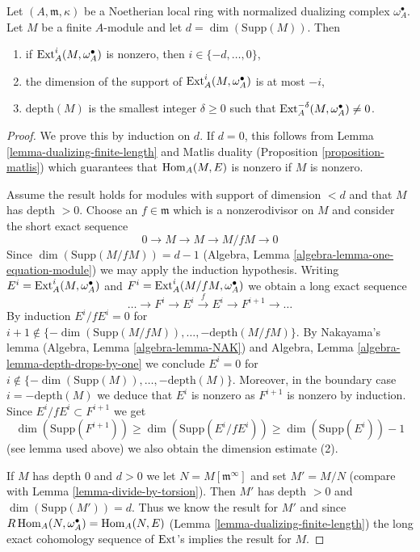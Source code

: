 \begin{lemma}
\label{lemma-sitting-in-degrees}
Let $(A, \mathfrak m, \kappa)$ be a Noetherian local ring with
normalized dualizing complex $\omega_A^\bullet$. Let $M$ be a finite
$A$-module and let $d = \dim(\text{Supp}(M))$. Then
\begin{enumerate}
\item if $\mathop{\mathrm{Ext}}\nolimits^i_A(M, \omega_A^\bullet)$ is nonzero, then
$i \in \{-d, \ldots, 0\}$,
\item the dimension of the support of $\mathop{\mathrm{Ext}}\nolimits^i_A(M, \omega_A^\bullet)$
is at most $-i$,
\item $\text{depth}(M)$ is the smallest integer $\delta \geq 0$ such that
$\mathop{\mathrm{Ext}}\nolimits^{-\delta}_A(M, \omega_A^\bullet) \not = 0$.
\end{enumerate}
\end{lemma}

\begin{proof}
We prove this by induction on $d$. If $d = 0$, this follows from
Lemma \ref{lemma-dualizing-finite-length} and Matlis duality
(Proposition \ref{proposition-matlis}) which guarantees that
$\mathop{\mathrm{Hom}}\nolimits_A(M, E)$ is nonzero if $M$ is nonzero.

\medskip\noindent
Assume the result holds for modules with support of dimension $< d$ and that
$M$ has depth $> 0$. Choose an $f \in \mathfrak m$ which is a nonzerodivisor
on $M$ and consider the short exact sequence
$$
0 \to M \to M \to M/fM \to 0
$$
Since $\dim(\text{Supp}(M/fM)) = d - 1$
(Algebra, Lemma \ref{algebra-lemma-one-equation-module}) we
may apply the induction hypothesis.
Writing
$E^i = \mathop{\mathrm{Ext}}\nolimits^i_A(M, \omega_A^\bullet)$ and
$F^i = \mathop{\mathrm{Ext}}\nolimits^i_A(M/fM, \omega_A^\bullet)$
we obtain a long exact sequence
$$
\ldots \to F^i \to E^i \xrightarrow{f} E^i \to F^{i + 1} \to \ldots
$$
By induction $E^i/fE^i = 0$ for
$i + 1 \not \in \{-\dim(\text{Supp}(M/fM)), \ldots, -\text{depth}(M/fM)\}$.
By Nakayama's lemma (Algebra, Lemma \ref{algebra-lemma-NAK})
and Algebra, Lemma \ref{algebra-lemma-depth-drops-by-one}
we conclude $E^i = 0$ for
$i \not \in \{-\dim(\text{Supp}(M)), \ldots, -\text{depth}(M)\}$.
Moreover, in the boundary case $i = - \text{depth}(M)$ we deduce that $E^i$
is nonzero as $F^{i + 1}$ is nonzero by induction.
Since $E^i/fE^i \subset F^{i + 1}$ we get
$$
\dim(\text{Supp}(F^{i + 1})) \geq \dim(\text{Supp}(E^i/fE^i))
\geq \dim(\text{Supp}(E^i)) - 1
$$
(see lemma used above) we also obtain the dimension estimate (2).

\medskip\noindent
If $M$ has depth $0$ and $d > 0$ we let $N = M[\mathfrak m^\infty]$ and set
$M' = M/N$ (compare with Lemma \ref{lemma-divide-by-torsion}).
Then $M'$ has depth $> 0$ and $\dim(\text{Supp}(M')) = d$.
Thus we know the result for $M'$ and since
$R\mathop{\mathrm{Hom}}\nolimits_A(N, \omega_A^\bullet) = \mathop{\mathrm{Hom}}\nolimits_A(N, E)$
(Lemma \ref{lemma-dualizing-finite-length})
the long exact cohomology sequence of $\mathop{\mathrm{Ext}}\nolimits$'s implies the
result for $M$.
\end{proof}


